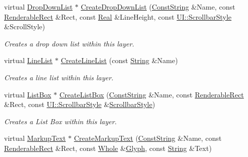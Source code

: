\begin{DoxyCompactItemize}
virtual \hyperlink{classMezzanine_1_1UI_1_1DropDownList}{DropDownList} $\ast$ \hyperlink{classMezzanine_1_1UI_1_1Layer_a6b0d315b69d28a29dddb3f19c22c8f8c}{CreateDropDownList} (\hyperlink{namespaceMezzanine_a63cd699ac54b73953f35ec9cfc05e506}{ConstString} \&Name, const \hyperlink{structMezzanine_1_1UI_1_1RenderableRect}{RenderableRect} \&Rect, const \hyperlink{namespaceMezzanine_a726731b1a7df72bf3583e4a97282c6f6}{Real} \&LineHeight, const \hyperlink{namespaceMezzanine_1_1UI_a5998a9bf372a7e92605c0c461736e763}{UI::ScrollbarStyle} \&ScrollStyle)
\begin{DoxyCompactList}\small\item\em Creates a drop down list within this layer. \item\end{DoxyCompactList}\item 
virtual \hyperlink{classMezzanine_1_1UI_1_1LineList}{LineList} $\ast$ \hyperlink{classMezzanine_1_1UI_1_1Layer_a9ada2f29775d8004534b204f40525e5a}{CreateLineList} (const \hyperlink{namespaceMezzanine_acf9fcc130e6ebf08e3d8491aebcf1c86}{String} \&Name)
\begin{DoxyCompactList}\small\item\em Creates a line list within this layer. \item\end{DoxyCompactList}\item 
virtual \hyperlink{classMezzanine_1_1UI_1_1ListBox}{ListBox} $\ast$ \hyperlink{classMezzanine_1_1UI_1_1Layer_a56fcefd3f12d19293ea23303c642c1b7}{CreateListBox} (\hyperlink{namespaceMezzanine_a63cd699ac54b73953f35ec9cfc05e506}{ConstString} \&Name, const \hyperlink{structMezzanine_1_1UI_1_1RenderableRect}{RenderableRect} \&Rect, const \hyperlink{namespaceMezzanine_1_1UI_a5998a9bf372a7e92605c0c461736e763}{UI::ScrollbarStyle} \&\hyperlink{namespaceMezzanine_1_1UI_a5998a9bf372a7e92605c0c461736e763}{ScrollbarStyle})
\begin{DoxyCompactList}\small\item\em Creates a List Box within this layer. \item\end{DoxyCompactList}\item 
virtual \hyperlink{classMezzanine_1_1UI_1_1MarkupText}{MarkupText} $\ast$ \hyperlink{classMezzanine_1_1UI_1_1Layer_a0206ad6de1e6510cd04fbab9a468df8d}{CreateMarkupText} (\hyperlink{namespaceMezzanine_a63cd699ac54b73953f35ec9cfc05e506}{ConstString} \&Name, const \hyperlink{structMezzanine_1_1UI_1_1RenderableRect}{RenderableRect} \&Rect, const \hyperlink{namespaceMezzanine_adcbb6ce6d1eb4379d109e51171e2e493}{Whole} \&\hyperlink{classMezzanine_1_1UI_1_1Glyph}{Glyph}, const \hyperlink{namespaceMezzanine_acf9fcc130e6ebf08e3d8491aebcf1c86}{String} \&Text)

\end{DoxyCompactItemize}
